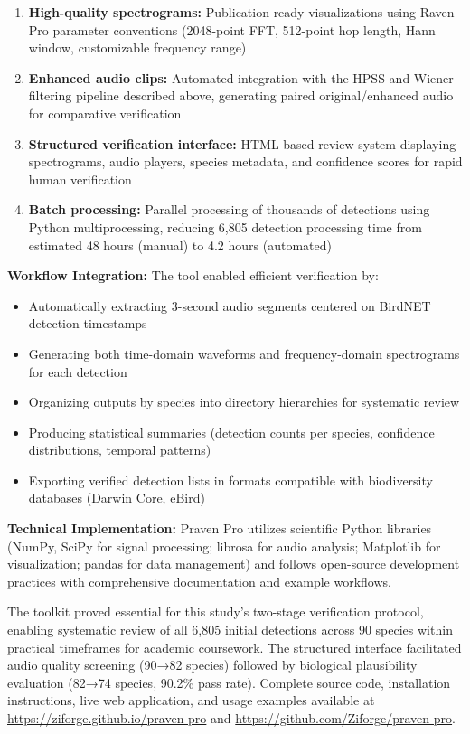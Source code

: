 \documentclass[twocolumn]{article}
\begin{document}
\begin{enumerate}
\item \textbf{High-quality spectrograms:} Publication-ready visualizations using Raven Pro parameter conventions (2048-point FFT, 512-point hop length, Hann window, customizable frequency range)

\item \textbf{Enhanced audio clips:} Automated integration with the HPSS and Wiener filtering pipeline described above, generating paired original/enhanced audio for comparative verification

\item \textbf{Structured verification interface:} HTML-based review system displaying spectrograms, audio players, species metadata, and confidence scores for rapid human verification

\item \textbf{Batch processing:} Parallel processing of thousands of detections using Python multiprocessing, reducing 6,805 detection processing time from estimated 48 hours (manual) to 4.2 hours (automated)
\end{enumerate}

\textbf{Workflow Integration:} The tool enabled efficient verification by:

\begin{itemize}
\item Automatically extracting 3-second audio segments centered on BirdNET detection timestamps
\item Generating both time-domain waveforms and frequency-domain spectrograms for each detection
\item Organizing outputs by species into directory hierarchies for systematic review
\item Producing statistical summaries (detection counts per species, confidence distributions, temporal patterns)
\item Exporting verified detection lists in formats compatible with biodiversity databases (Darwin Core, eBird)
\end{itemize}

\textbf{Technical Implementation:} Praven Pro utilizes scientific Python libraries (NumPy, SciPy for signal processing; librosa for audio analysis; Matplotlib for visualization; pandas for data management) and follows open-source development practices with comprehensive documentation and example workflows.

The toolkit proved essential for this study's two-stage verification protocol, enabling systematic review of all 6,805 initial detections across 90 species within practical timeframes for academic coursework. The structured interface facilitated audio quality screening (90→82 species) followed by biological plausibility evaluation (82→74 species, 90.2\% pass rate). Complete source code, installation instructions, live web application, and usage examples available at \url{https://ziforge.github.io/praven-pro} and \url{https://github.com/Ziforge/praven-pro}.
\end{document}
